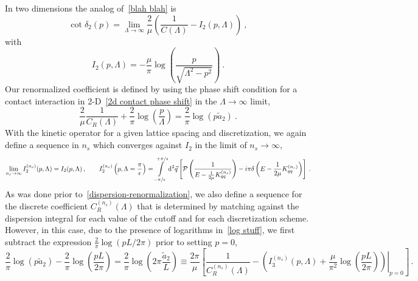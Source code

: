 In two dimensions the analog of~\eqref{blah blah} is
\begin{equation}
\cot \delta_2(p)=\lim_{\Lambda\to\infty}\frac{2}{\mu}\left(\frac{1}{C(\Lambda)}- I_2(p, \Lambda)\right)\ , %
\end{equation}
with
\begin{equation}
I_2(p, \Lambda)=-\frac{\mu}{\pi } \log \left(\frac{p}{\sqrt{\Lambda ^2-p^2}}\right)\ .
\end{equation}
Our renormalized coefficient is defined by using the phase shift condition for a contact interaction in 2-D~\eqref{2d contact phase shift} in the $\Lambda\to\infty$ limit,
\begin{equation}\label{eq:log stuff}
\frac{2}{\mu}\frac{1}{C_R(\Lambda)}+\frac{2}{\pi } \log \left(\frac{p}{\Lambda}\right)=\frac { 2 } { \pi } \log \left( p \tilde a _ { 2 } \right)\ .
\end{equation}
With the kinetic operator for a given lattice spacing and discretization, we again define a sequence in $n_s$ which converges against $I_2$ in the limit of $n_s \to \infty$,
\begin{equation}
	\lim\limits_{n_s \to \infty} I^{(n_s)}_2(p, \Lambda) = I_2(p, \Lambda)
	\, , \qquad
	I^{(n_s)}_2\left(p, \Lambda=\frac{\pi}{\epsilon} \right)
	=
	    \int\limits_{-\pi/\epsilon}^{+\pi/\epsilon}
        \mathrm{d}^2 \vec{q}
        \left[
            \mathcal{P} \left(
                \frac{1}{
                    E - \frac{1}{2\mu} K_{qq}^{(n_s)} }
                \right)
            -i \pi \delta\left(E - \frac{1}{2\mu}K_{qq}^{(n_s)}\right)
        \right]
        \, .
\end{equation}
As was done prior to~\eqref{dispersion-renormalization}, we also define a sequence for the discrete coefficient $C^{(n_s)}_R(\Lambda)$ that is determined by matching against the dispersion integral for each value of the cutoff and for each discretization scheme.  However, in this case, due to the presence of logarithms in~\eqref{log stuff}, we first subtract the expression $\frac{2}{\pi}\log(pL/2\pi)$ prior to setting $p=0$,
\begin{equation}\label{eq:dispersion-renormalization}
	\frac { 2 } { \pi } \log \left( p \tilde a _ { 2 } \right)-\frac{2}{\pi } \log \left(\frac{pL}{2\pi}\right)=\frac { 2 } { \pi } \log \left(2\pi \frac{\tilde a _ { 2 }}{L} \right)
	\equiv
	\frac{2 \pi}{\mu}
		\left[
		\frac{1}{C_R^{(n_s)}(\Lambda)} - \left.\left(I_3^{(n_s)}(p, \Lambda)+\frac{\mu}{\pi^2} \log \left(\frac{pL}{2\pi}\right)\right)\right|_{p=0}
		\right]
	\, .
\end{equation}
